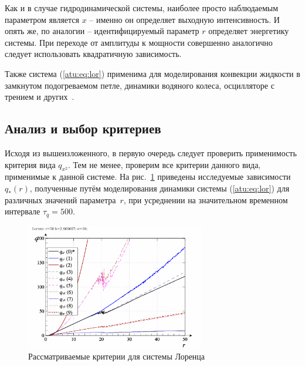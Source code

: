 Как и в случае гидродинамической системы, наиболее просто наблюдаемым
параметром является $x$ -- именно он определяет выходную интенсивность. И
опять же, по аналогии -- идентифицируемый параметр $r$ определяет энергетику
системы. При переходе от амплитуды к мощности совершенно аналогично
следует использовать квадратичную зависимость.

Также система (\ref{atu:eq:lor}) применима для
моделирования конвекции жидкости в замкнутом подогреваемом петле,
динамики водяного колеса, осцилляторе с трением и других~\cite{kuznetsov_dyn_chaos}.



\subsection{Анализ и выбор критериев}  %

Исходя из вышеизложенного, в первую очередь следует проверить применимость
критерия вида $q_{x^2}$. Тем не менее, проверим все
критерии данного вида, применимые к данной системе.
На рис.~\ref{atu:f:lor_q} приведены исследуемые зависимости
$q_{*}(r)$, полученные путём моделирования динамики
системы (\ref{atu:eq:lor}) для различных значений параметра~$r$,
при усреднении на значительном временном интервале $\tau_q=500$.


\begin{figure}[ht!]
  \centerline{\includegraphics[width=0.7\textwidth]{p/cha/lor/lor_q-p_q_r.png} }
  \caption{Рассматриваемые критерии для системы Лоренца}
  \label{atu:f:lor_q}
\end{figure}


